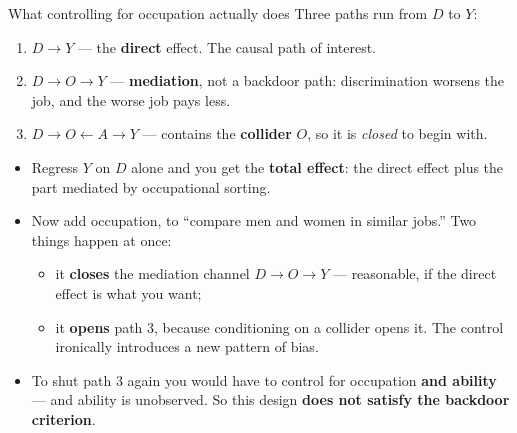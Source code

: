 \documentclass[
  11pt,
  ignorenonframetext,
  aspectratio=169,
]{beamer}
\providecommand{\tightlist}{%
  \setlength{\itemsep}{0pt}\setlength{\parskip}{0pt}}
\begin{document}
\begin{frame}{What controlling for occupation actually does}
\protect{}\label{what-controlling-for-occupation-actually-does}
Three paths run from \(D\) to \(Y\):

\begin{enumerate}
\tightlist
\item
  \(D \to Y\) --- the \textbf{direct} effect. The causal path of
  interest.
\item
  \(D \to O \to Y\) --- \textbf{mediation}, not a backdoor path:
  discrimination worsens the job, and the worse job pays less.
\item
  \(D \to O \leftarrow A \to Y\) --- contains the \textbf{collider}
  \(O\), so it is \emph{closed} to begin with.
\end{enumerate}

\vspace{0.2em}

\begin{itemize}
\tightlist
\item
  Regress \(Y\) on \(D\) alone and you get the \textbf{total effect}:
  the direct effect plus the part mediated by occupational sorting.
\item
  Now add occupation, to ``compare men and women in similar jobs.'' Two
  things happen at once:

  \begin{itemize}
  \tightlist
  \item
    it \textbf{closes} the mediation channel \(D \to O \to Y\) ---
    reasonable, if the direct effect is what you want;
  \item
    it \textbf{opens} path 3, because conditioning on a collider opens
    it. The control ironically introduces a new pattern of bias.
  \end{itemize}
\item
  To shut path 3 again you would have to control for occupation
  \textbf{and ability} --- and ability is unobserved. So this design
  \textbf{does not satisfy the backdoor criterion}.
\end{itemize}
\end{frame}
\end{document}
